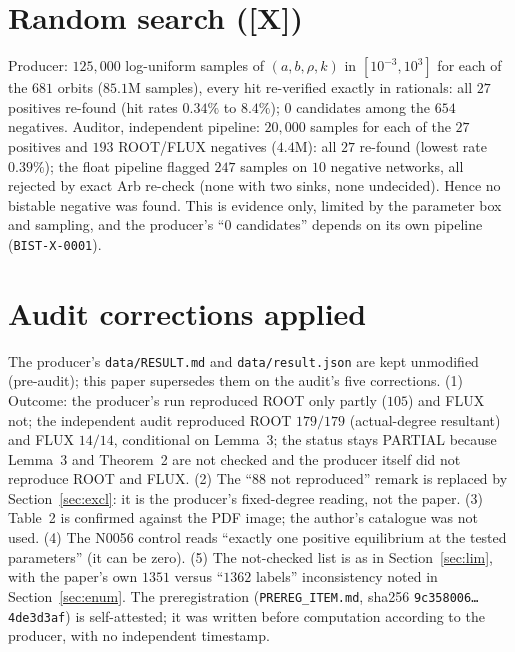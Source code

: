 \documentclass[10pt]{article}
\newcommand{\tier}[1]{\textsf{[#1]}}
\newcommand{\tX}{\tier{X}}
\begin{document}
\section{Random search (\tX{})}\label{sec:search}
Producer: $125{,}000$ log-uniform samples of $(a,b,\rho,k)$ in $[10^{-3},10^{3}]$ for each of the $681$ orbits ($85.1$M samples), every hit re-verified exactly in rationals: all $27$ positives re-found (hit rates $0.34\%$ to $8.4\%$); $0$ candidates among the $654$ negatives. Auditor, independent pipeline: $20{,}000$ samples for each of the $27$ positives and $193$ ROOT/FLUX negatives ($4.4$M): all $27$ re-found (lowest rate $0.39\%$); the float pipeline flagged $247$ samples on $10$ negative networks, all rejected by exact Arb re-check (none with two sinks, none undecided). Hence no bistable negative was found. This is evidence only, limited by the parameter box and sampling, and the producer's ``$0$ candidates'' depends on its own pipeline (\texttt{BIST-X-0001}).

\section{Audit corrections applied}\label{sec:corr}
The producer's \texttt{data/RESULT.md} and \texttt{data/result.json} are kept unmodified (pre-audit); this paper supersedes them on the audit's five corrections. (1) Outcome: the producer's run reproduced ROOT only partly ($105$) and FLUX not; the independent audit reproduced ROOT $179/179$ (actual-degree resultant) and FLUX $14/14$, conditional on Lemma~3; the status stays PARTIAL because Lemma~3 and Theorem~2 are not checked and the producer itself did not reproduce ROOT and FLUX. (2) The ``$88$ not reproduced'' remark is replaced by Section~\ref{sec:excl}: it is the producer's fixed-degree reading, not the paper. (3) Table~2 is confirmed against the PDF image; the author's catalogue was not used. (4) The N0056 control reads ``exactly one positive equilibrium at the tested parameters'' (it can be zero). (5) The not-checked list is as in Section~\ref{sec:lim}, with the paper's own $1351$ versus ``$1362$ labels'' inconsistency noted in Section~\ref{sec:enum}. The preregistration (\texttt{PREREG\_ITEM.md}, sha256 \texttt{9c358006\dots 4de3d3af}) is self-attested; it was written before computation according to the producer, with no independent timestamp.
\end{document}
